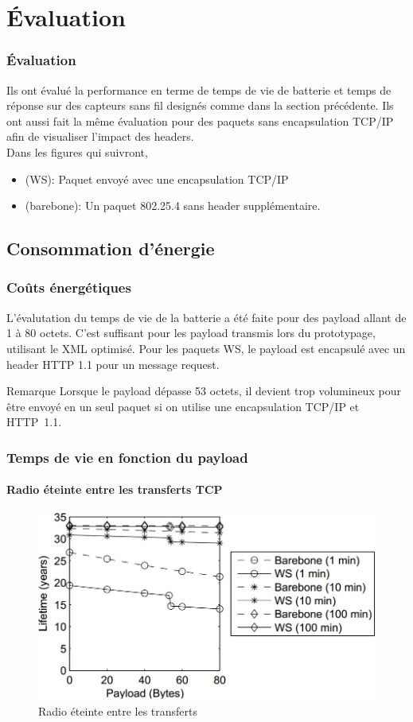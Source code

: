 \section{Évaluation}
\begin{frame}
\frametitle{Évaluation}
Ils ont évalué la performance en terme de temps de vie de batterie et temps de réponse sur des capteurs sans fil designés comme dans la section précédente.
Ils ont aussi fait la même évaluation pour des paquets sans encapsulation TCP/IP afin de visualiser l'impact des headers.\\
\vspace{5mm}
Dans les figures qui suivront,
\begin{itemize}
 \item (WS): Paquet envoyé avec une encapsulation TCP/IP %
 \item (barebone): Un paquet 802.25.4 sans header supplémentaire.
\end{itemize}
\end{frame}

\subsection{Consommation d'énergie}
\begin{frame}
 \frametitle{Coûts énergétiques}
 L'évalutation du temps de vie de la batterie a été faite pour des payload allant de 1 à 80 octets.
 C'est suffisant pour les payload transmis lors du prototypage, utilisant le XML optimisé.
 Pour les paquets WS, le payload est encapsulé avec un header HTTP 1.1 pour un message request.
 \begin{block}{Remarque}
  Lorsque le payload dépasse 53 octets, il devient trop volumineux pour être envoyé en un seul paquet si on utilise une encapsulation TCP/IP et HTTP~1.1.
 \end{block}
\end{frame}

\def \radiosca {0.4}
\begin{frame}
 \frametitle{Temps de vie en fonction du payload}
 \framesubtitle{Radio éteinte entre les transferts TCP}
 \begin{figure}
  \centering
  \includegraphics[scale=\radiosca]{figures/radiooff.jpg}
  \caption{Radio éteinte entre les transferts}
 \end{figure} 
\end{frame}

